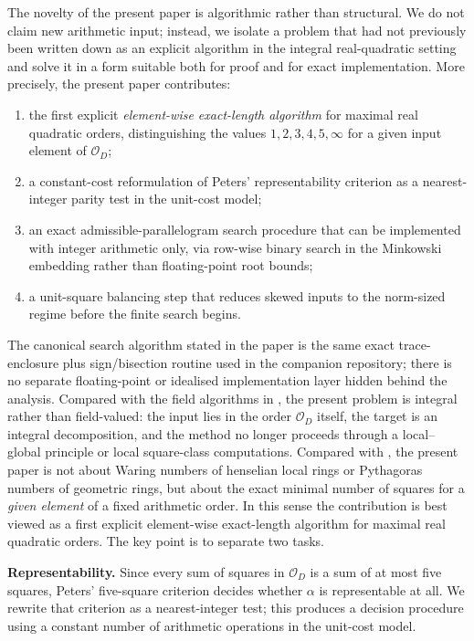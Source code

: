 \documentclass[manuscript,screen]{acmart}
\theoremstyle{plain}
\theoremstyle{definition}
\theoremstyle{nonitalicremark}
\newcommand{\OD}{\mathcal{O}_D}
\begin{document}
The novelty of the present paper is algorithmic rather than structural. We do not claim new
arithmetic input; instead, we isolate a problem that had not previously been written down as an
explicit algorithm in the integral real-quadratic setting and solve it in a form suitable both for
proof and for exact implementation. More precisely, the present paper contributes:
\begin{enumerate}[label=\textup{(N\arabic*)},itemsep=0.25em]
\item the first explicit \emph{element-wise exact-length algorithm} for maximal real quadratic
orders, distinguishing the values $1,2,3,4,5,\infty$ for a given input element of $\OD$;
\item a constant-cost reformulation of Peters' representability criterion as a nearest-integer
parity test in the unit-cost model;
\item an exact admissible-parallelogram search procedure that can be implemented with integer
arithmetic only, via row-wise binary search in the Minkowski embedding rather than floating-point
root bounds;
\item a unit-square balancing step that reduces skewed inputs to the norm-sized regime before the
finite search begins.
\end{enumerate}
The canonical search algorithm stated in the paper is the same exact trace-enclosure plus
sign/bisection routine used in the companion repository; there is no separate floating-point or
idealised implementation layer hidden behind the analysis.
Compared with the field algorithms in
\cite{DMR,DMGF,Kop,KopIso,KopDyadic}, the present problem is integral rather than field-valued: the
input lies in the order $\OD$ itself, the target is an integral decomposition, and the method no
longer proceeds through a local--global principle or local square-class computations. Compared
with \cite{KMHenselian,KowSurf}, the present paper is not about Waring numbers of henselian local
rings or Pythagoras numbers of geometric rings, but about the exact minimal number of squares for
a \emph{given element} of a fixed arithmetic order. In this sense the contribution is best viewed
as a first explicit element-wise exact-length algorithm for maximal real quadratic orders. The key
point is to separate two tasks.

\noindent\textbf{Representability.}
Since every sum of squares in $\OD$ is a sum of at most five squares, Peters' five-square
criterion decides whether $\alpha$ is representable at all.
We rewrite that criterion as a nearest-integer test; this produces a decision procedure using a
constant number of arithmetic operations in the unit-cost model.
\end{document}
